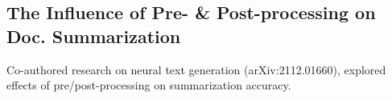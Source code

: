 \documentclass[10pt]{article}
\begin{document}
\subsection*{The Influence of Pre- \& Post-processing on Doc. Summarization \hfill {}}
\noindent
\begin{asparaitem}
    \item Co-authored research on neural text generation (arXiv:2112.01660), explored effects of pre/post-processing on summarization accuracy.

\end{asparaitem}
\end{document}
